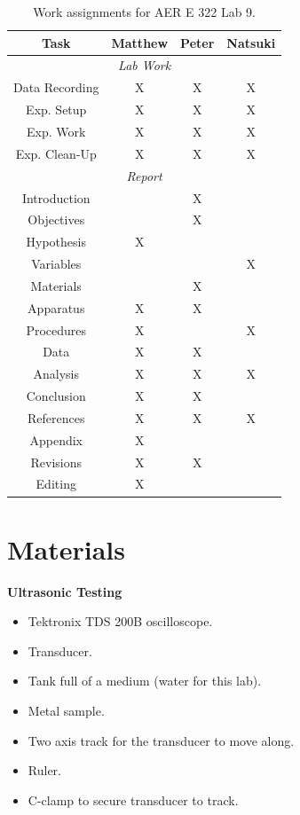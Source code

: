 \documentclass[12 pt]{report}
\begin{document}
\begin{table}[!htbp]
\caption{Work assignments for AER E 322 Lab 9.}
\begin{center}
	\begin{tabular}{|c|c|c|c|}
		\hline
		\multicolumn{1}{|c|}{\textbf{Task}}&\textbf{Matthew}&\textbf{Peter}&\textbf{Natsuki}\\
		\hline
		\multicolumn{4}{|c|}{\textit{Lab Work}}\\
		\hline
		Data Recording&X&X&X\\
		\hline
		Exp. Setup&X&X&X\\
		\hline
		Exp. Work&X&X&X\\
		\hline
		Exp. Clean-Up&X&X&X\\
		\hline
		\multicolumn{4}{|c|}{\textit{Report}}\\
		\hline
		Introduction&&X&\\
		\hline
		Objectives&&X&\\
		\hline
		Hypothesis&X&&\\
		\hline
		Variables&&&X\\
		\hline
		Materials&&X&\\
		\hline
		Apparatus&X&X&\\
		\hline
		Procedures&X&&X\\
		\hline
		Data&X&X&\\
		\hline
		Analysis&X&X&X\\
		\hline
		Conclusion&X&X&\\
		\hline
		References&X&X&X\\
		\hline
		Appendix&X&&\\
		\hline
		Revisions&X&X&\\
		\hline
		Editing&X&&\\
		\hline
	\end{tabular}
\end{center}
\label{tbl:work_assignments}
\end{table}

\section{Materials} \label{materials}
\textbf{Ultrasonic Testing}
\begin{itemize}
	\item Tektronix TDS 200B oscilloscope.
	\item Transducer.
	\item Tank full of a medium (water for this lab).
	\item Metal sample.
	\item Two axis track for the transducer to move along.
	\item Ruler.
	\item C-clamp to secure transducer to track.
\end{itemize}
\end{document}
